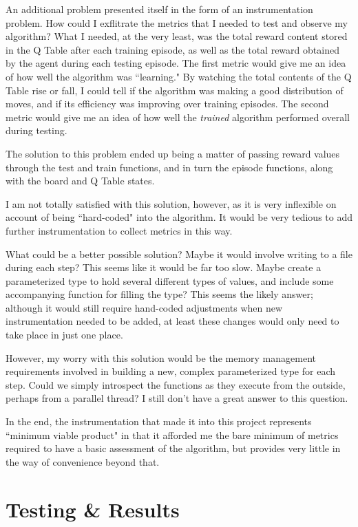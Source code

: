 \documentclass[12pt,a4paper]{article}
\begin{document}
		\par An additional problem presented itself in the form of an instrumentation problem. How could I exflitrate the metrics that I needed to test and observe my algorithm? What I needed, at the very least, was the total reward content stored in the Q Table after each training episode, as well as the total reward obtained by the agent during each testing episode. The first metric would give me an idea of how well the algorithm was ``learning." By watching the total contents of the Q Table rise or fall, I could tell if the algorithm was making a good distribution of moves, and if its efficiency was improving over training episodes. The second metric would give me an idea of how well the \textit{trained} algorithm performed overall during testing.
		\par The solution to this problem ended up being a matter of passing reward values through the test and train functions, and in turn the episode functions, along with the board and Q Table states. 
		\par I am not totally satisfied with this solution, however, as it is very inflexible on account of being ``hard-coded" into the algorithm. It would be very tedious to add further instrumentation to collect metrics in this way.
		\par What could be a better possible solution? Maybe it would involve writing to a file during each step? This seems like it would be far too slow. Maybe create a parameterized type to hold several different types of values, and include some accompanying function for filling the type? This seems the likely answer; although it would still require hand-coded adjustments when new instrumentation needed to be added, at least these changes would only need to take place in just one place. 
		\par However, my worry with this solution would be the memory management requirements involved in building a new, complex parameterized type for each step. Could we simply introspect the functions as they execute from the outside, perhaps from a parallel thread? I still don't have a great answer to this question.
		\par In the end, the instrumentation that made it into this project represents ``minimum viable product" in that it afforded me the bare minimum of metrics required to have a basic assessment of the algorithm, but provides very little in the way of convenience beyond that. 
		
			
	\section{Testing \& Results}
	
\end{document}
